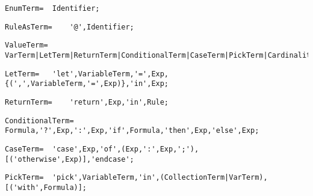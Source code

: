 \documentclass{article}
\begin{document}
    \begin{flushleft}
    \begin{lstlisting}[mathescape=true, breaklines=true]
     EnumTerm= 	Identifier;
    \end{lstlisting}
    \end{flushleft}
    \begin{flushleft}
    \begin{lstlisting}[mathescape=true, breaklines=true]
     RuleAsTerm= 	'@',Identifier;
    \end{lstlisting}
    \end{flushleft}
    \begin{flushleft}
    \begin{lstlisting}[mathescape=true, breaklines=true]
     ValueTerm= 	VarTerm|LetTerm|ReturnTerm|ConditionalTerm|CaseTerm|PickTerm|CardinalityTerm;
    \end{lstlisting}
    \end{flushleft}
    \begin{flushleft}
    \begin{lstlisting}[mathescape=true, breaklines=true]
     LetTerm= 	'let',VariableTerm,'=',Exp,{(',',VariableTerm,'=',Exp)},'in',Exp;
    \end{lstlisting}
    \end{flushleft}
    \begin{flushleft}
    \begin{lstlisting}[mathescape=true, breaklines=true]
     ReturnTerm= 	'return',Exp,'in',Rule;
    \end{lstlisting}
    \end{flushleft}
    \begin{flushleft}
    \begin{lstlisting}[mathescape=true, breaklines=true]
     ConditionalTerm= 	Formula,'?',Exp,':',Exp,'if',Formula,'then',Exp,'else',Exp;
    \end{lstlisting}
    \end{flushleft}
    \begin{flushleft}
    \begin{lstlisting}[mathescape=true, breaklines=true]
     CaseTerm= 	'case',Exp,'of',(Exp,':',Exp,';'),[('otherwise',Exp)],'endcase';
    \end{lstlisting}
    \end{flushleft}
    \begin{flushleft}
    \begin{lstlisting}[mathescape=true, breaklines=true]
     PickTerm= 	'pick',VariableTerm,'in',(CollectionTerm|VarTerm),[('with',Formula)];
    \end{lstlisting}
    \end{flushleft}
\end{document}
